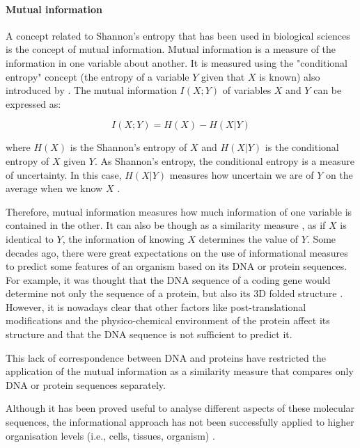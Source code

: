 \paragraph{Mutual information}

A concept related to Shannon's entropy that has been used in biological sciences is the concept of mutual information. Mutual information is a measure of the information in one variable about another. It is measured using the "conditional entropy" concept (the entropy of a variable $Y$ given that $X$ is known) also introduced by \citet{Shannon1948}.
The mutual information $I(X;Y)$ of variables $X$ and $Y$ can be expressed as:
 
 $$I(X;Y) = H(X) - H(X|Y)$$

where $H(X)$ is the Shannon's entropy of $X$ and $H(X|Y)$ is the conditional entropy of $X$ given $Y$. As Shannon's entropy, the conditional entropy is a measure of uncertainty. In this case, $H(X|Y)$ measures how uncertain we are of $Y$ on the average when we know $X$ \citep{Shannon1948}.

Therefore, mutual information measures how much information of one variable is contained in the other. It can also be though as a similarity measure \citep{yockey2005information}, as if $X$ is identical to $Y$, the information of knowing $X$ determines the value of $Y$.
Some decades ago, there were great expectations on the use of informational measures to predict some features of an organism based on its DNA or protein sequences. For example, it was thought that the DNA sequence of a coding gene would determine not only the sequence of a protein, but also its 3D folded structure \citep{Anfinsen1973}.
However, it is nowadays clear that other factors like post-translational modifications and the physico-chemical environment of the protein affect its structure \citep{Kang2009} and that the DNA sequence is not sufficient to predict it.

This lack of correspondence between DNA and proteins have restricted the application of the mutual information as a similarity measure that compares only DNA \citep{Lichtenstein2015} or protein sequences \citep{Gloor2005} separately.

Although it has been proved useful to analyse different aspects of these molecular sequences, the informational approach has not been successfully applied to higher organisation levels (i.e., cells, tissues, organism) \citep{Longo2012}. 

